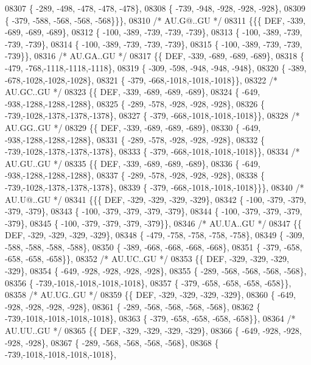 \begin{DoxyCode}
08307 \{ -289, -498, -478, -478, -478\},
08308 \{ -739, -948, -928, -928, -928\},
08309 \{ -379, -588, -568, -568, -568\}\}\},
08310 \textcolor{comment}{/* AU.G@..GU */}
08311 \{\{\{  DEF, -339, -689, -689, -689\},
08312 \{ -100, -389, -739, -739, -739\},
08313 \{ -100, -389, -739, -739, -739\},
08314 \{ -100, -389, -739, -739, -739\},
08315 \{ -100, -389, -739, -739, -739\}\},
08316 \textcolor{comment}{/* AU.GA..GU */}
08317 \{\{  DEF, -339, -689, -689, -689\},
08318 \{ -479, -768,-1118,-1118,-1118\},
08319 \{ -309, -598, -948, -948, -948\},
08320 \{ -389, -678,-1028,-1028,-1028\},
08321 \{ -379, -668,-1018,-1018,-1018\}\},
08322 \textcolor{comment}{/* AU.GC..GU */}
08323 \{\{  DEF, -339, -689, -689, -689\},
08324 \{ -649, -938,-1288,-1288,-1288\},
08325 \{ -289, -578, -928, -928, -928\},
08326 \{ -739,-1028,-1378,-1378,-1378\},
08327 \{ -379, -668,-1018,-1018,-1018\}\},
08328 \textcolor{comment}{/* AU.GG..GU */}
08329 \{\{  DEF, -339, -689, -689, -689\},
08330 \{ -649, -938,-1288,-1288,-1288\},
08331 \{ -289, -578, -928, -928, -928\},
08332 \{ -739,-1028,-1378,-1378,-1378\},
08333 \{ -379, -668,-1018,-1018,-1018\}\},
08334 \textcolor{comment}{/* AU.GU..GU */}
08335 \{\{  DEF, -339, -689, -689, -689\},
08336 \{ -649, -938,-1288,-1288,-1288\},
08337 \{ -289, -578, -928, -928, -928\},
08338 \{ -739,-1028,-1378,-1378,-1378\},
08339 \{ -379, -668,-1018,-1018,-1018\}\}\},
08340 \textcolor{comment}{/* AU.U@..GU */}
08341 \{\{\{  DEF, -329, -329, -329, -329\},
08342 \{ -100, -379, -379, -379, -379\},
08343 \{ -100, -379, -379, -379, -379\},
08344 \{ -100, -379, -379, -379, -379\},
08345 \{ -100, -379, -379, -379, -379\}\},
08346 \textcolor{comment}{/* AU.UA..GU */}
08347 \{\{  DEF, -329, -329, -329, -329\},
08348 \{ -479, -758, -758, -758, -758\},
08349 \{ -309, -588, -588, -588, -588\},
08350 \{ -389, -668, -668, -668, -668\},
08351 \{ -379, -658, -658, -658, -658\}\},
08352 \textcolor{comment}{/* AU.UC..GU */}
08353 \{\{  DEF, -329, -329, -329, -329\},
08354 \{ -649, -928, -928, -928, -928\},
08355 \{ -289, -568, -568, -568, -568\},
08356 \{ -739,-1018,-1018,-1018,-1018\},
08357 \{ -379, -658, -658, -658, -658\}\},
08358 \textcolor{comment}{/* AU.UG..GU */}
08359 \{\{  DEF, -329, -329, -329, -329\},
08360 \{ -649, -928, -928, -928, -928\},
08361 \{ -289, -568, -568, -568, -568\},
08362 \{ -739,-1018,-1018,-1018,-1018\},
08363 \{ -379, -658, -658, -658, -658\}\},
08364 \textcolor{comment}{/* AU.UU..GU */}
08365 \{\{  DEF, -329, -329, -329, -329\},
08366 \{ -649, -928, -928, -928, -928\},
08367 \{ -289, -568, -568, -568, -568\},
08368 \{ -739,-1018,-1018,-1018,-1018\},

\end{DoxyCode}
